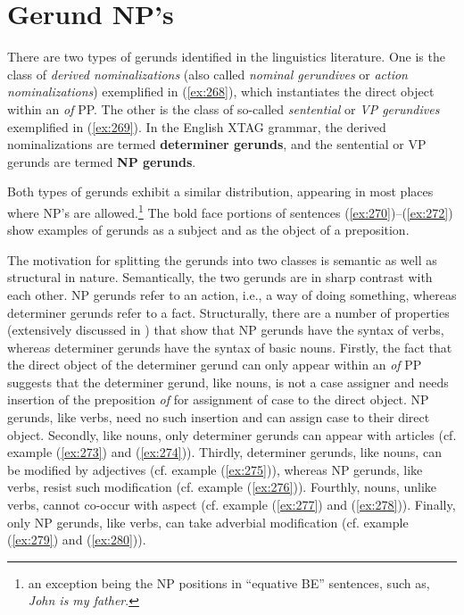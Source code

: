 \chapter{Gerund NP's} 
\label{gerunds-chapter} 
 
There are two types of gerunds identified in the linguistics 
literature. One is the class of {\it derived nominalizations} (also 
called {\it nominal gerundives} or {\it action nominalizations}) 
exemplified in (\ref{ex:268}), which instantiates the direct object within an 
{\it of} PP. 
The other is the class of so-called {\it sentential} or 
{\it VP gerundives} exemplified in (\ref{ex:269}). In the English XTAG grammar, 
the derived nominalizations are termed {\bf determiner gerunds}, and the 
sentential or VP gerunds are termed {\bf NP gerunds}. 
 
\beginsentences
{}\label{ex:268} 
\endsentences

 
\beginsentences
{}\label{ex:269} 
\endsentences

 
Both types of gerunds exhibit a similar distribution, appearing in most 
places where NP's are allowed.\footnote{an exception being the NP positions in ``equative BE'' sentences, such as, {\it John is my father}.}  The bold 
face portions of sentences (\ref{ex:270})--(\ref{ex:272}) show examples of gerunds as a 
subject and as the object of a preposition. 
 
\beginsentences
{}\label{ex:270} 
\label{ex:271} 
\label{ex:272} 
\endsentences

 
The motivation for splitting the gerunds into two classes is semantic as 
well as structural in nature. Semantically, the two gerunds are in sharp 
contrast with each other. NP gerunds refer to an action, i.e., a way of 
doing something, whereas determiner gerunds refer to a fact. Structurally, 
there are a number of properties (extensively discussed in \cite{Lees60}) 
that show that NP gerunds have the syntax of verbs, whereas determiner 
gerunds have the syntax of basic nouns.  Firstly, the fact that the direct 
object of the determiner gerund can only appear within an {\it of} PP 
suggests that the determiner gerund, like nouns, is not a case assigner and 
needs insertion of the preposition {\it of} for assignment of case to the 
direct object. NP gerunds, like verbs, need no such insertion and can 
assign case to their direct object.  Secondly, like nouns, only determiner 
gerunds can appear with articles (cf. example (\ref{ex:273}) and 
(\ref{ex:274})). Thirdly, determiner gerunds, like nouns, can be modified by 
adjectives (cf. example (\ref{ex:275})), whereas NP gerunds, like verbs, resist 
such modification (cf. example (\ref{ex:276})). Fourthly, nouns, unlike verbs, 
cannot co-occur with aspect (cf. example (\ref{ex:277}) and (\ref{ex:278})). Finally, 
only NP gerunds, like verbs, can take adverbial modification (cf. example 
(\ref{ex:279}) and (\ref{ex:280})). 
 
